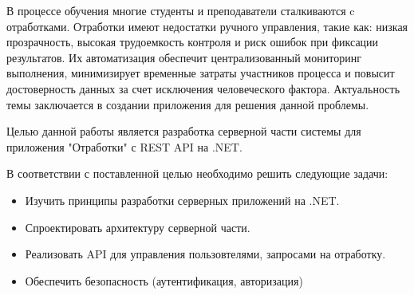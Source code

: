\intro

В процессе обучения многие студенты и преподаватели сталкиваются c отработками. Отработки имеют недостатки ручного управления, такие как: низкая прозрачность, высокая трудоемкость контроля и риск ошибок при фиксации результатов. Их автоматизация обеспечит централизованный мониторинг выполнения, минимизирует временные затраты участников процесса и повысит достоверность данных за счет исключения человеческого фактора. Актуальность темы заключается в создании приложения для решения данной проблемы.

Целью данной работы является разработка серверной части системы для приложения "Отработки" с REST API на .NET.

В соответствии с поставленной целью необходимо решить следующие задачи:
\begin{itemize}
	\item{Изучить принципы разработки серверных приложений на .NET.}
	\item{Спроектировать архитектуру серверной части.}
	\item{Реализовать API для управления пользовтелями, запросами на отработку.}
	\item{Обеспечить безопасность (аутентификация, авторизация)}
\end{itemize}
